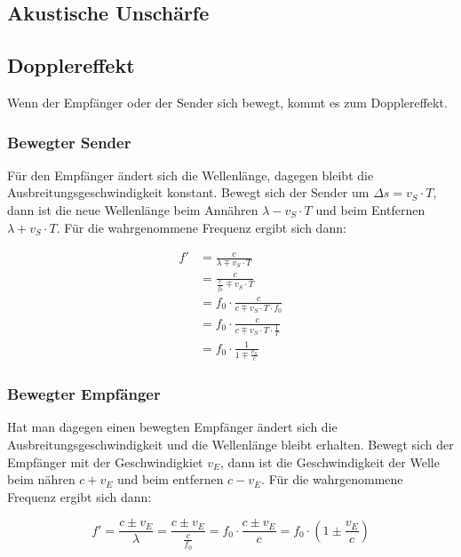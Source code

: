 \documentclass[a4paper]{article}
\begin{document}
		\subsection{Akustische Unschärfe}%
	
		\subsection{Dopplereffekt}
		
			Wenn der Empfänger oder der Sender sich bewegt, kommt es zum Dopplereffekt.
			
			
			\subsubsection{Bewegter Sender}
			
				Für den Empfänger ändert sich die Wellenlänge, dagegen bleibt die Ausbreitungsgeschwindigkeit konstant. Bewegt sich der Sender um $\Delta s = v_S\cdot T$, dann ist die neue Wellenlänge beim Annähren $\lambda - v_S\cdot T$ und beim Entfernen $\lambda + v_S\cdot T$. Für die wahrgenommene Frequenz ergibt sich dann:
				
				\begin{equation}
				\begin{aligned} 
					f'&=\frac{c}{\lambda \mp v_S\cdot T} \\
					&= \frac{c}{\frac{c}{f_0} \mp v_S\cdot T}\\
					&= f_0\cdot\frac{c}{c \mp v_S\cdot T\cdot f_0}\\
					&= f_0\cdot\frac{c}{c \mp v_S\cdot T\cdot \frac{1}{T}}\\
					&= f_0\cdot\frac{1}{1 \mp \frac{v_S}{c}}
				\end{aligned}
				\end{equation}
				
			\subsubsection{Bewegter Empfänger}
				Hat man dagegen einen bewegten Empfänger ändert sich die Ausbreitungsgeschwindigkeit und die Wellenlänge bleibt erhalten. Bewegt sich der Empfänger mit der Geschwindigkiet $v_E$, dann ist die Geschwindigkeit der Welle beim nähren $c+v_E$ und beim entfernen $c-v_E$. Für die wahrgenommene Frequenz ergibt sich dann:
				
				\begin{equation}
					f' = \frac{c \pm v_E}{\lambda} =  \frac{c \pm v_E}{\frac{c}{f_0}} = f_0\cdot\frac{c\pm v_E}{c} = f_0\cdot\left(1\pm \frac{v_E}{c}\right)
				\end{equation}
				
\end{document}
